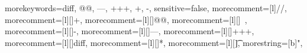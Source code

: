 
{
    morekeywords={diff, @@, ---, +++, +, -},
    sensitive=false,
    morecomment=[l]{//},
    morecomment=[l][\color{darkgreen}]{+},
    morecomment=[l][\color{NavyBlue}]{@@},
    morecomment=[l][\color{black}]{\ },
    morecomment=[l][\color{red}]{-},
    morecomment=[l][\color{blue}]{---},
    morecomment=[l][\color{blue}]{+++},
    morecomment=[l][\color{black}]{diff},
    morecomment=[l][\color{black}]{*},
    morecomment=[l][\color{black}]{\t},
    morestring=[b]",
}
